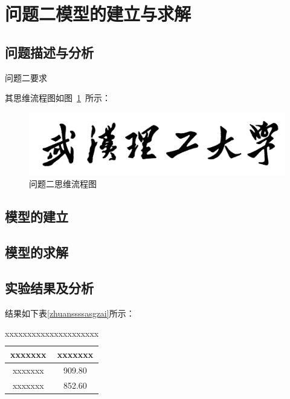 \documentclass{whutmod}
\begin{document}
    

	\section{问题二模型的建立与求解}
		\subsection{问题描述与分析}
			问题二要求

    		其思维流程图如图~\ref{lssssct}~所示：

			\begin{figure}[H]
				\centering
				\includegraphics[width=\textwidth]{figures/whut.jpg}
				\caption{问题二思维流程图}\label{lssssct}
			\end{figure}

		\subsection{模型的建立}
		
		\subsection{模型的求解}

        \subsection{实验结果及分析}
        
			结果如下表\ref{zhuanssssasgzai}所示：
			\begin{table}[H]
			\centering		
			\caption{xxxxxxxxxxxxxxxxxxxxx}\label{biao1}
			\begin{tabular}{cc}
			\toprule[2pt]
				\multicolumn{1}{m{5cm}}{\centering xxxxxxx}
				& \multicolumn{1}{m{5cm}}{\centering xxxxxxx}
				\\
				\midrule[1pt]
				xxxxxxx &   909.80\\ 
				xxxxxxx & 	852.60\\ 
			\bottomrule[2pt]	
			\end{tabular}
			\end{table}
  
\end{document}

